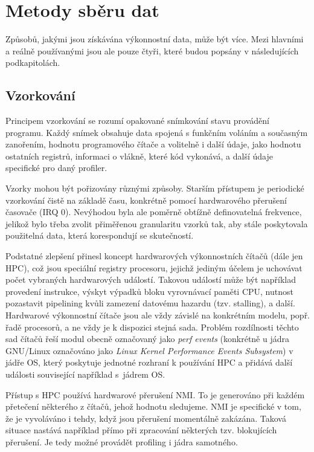 \documentclass[czech,BP]{thesiskiv}
\begin{document}
\section{Metody sběru dat}

Způsobů, jakými jsou získávána výkonnostní data, může být více. Mezi hlavními a reálně používanými jsou ale pouze čtyři, které budou popsány v následujících podkapitolách.

\subsection{Vzorkování}\label{subsec:sampling}

Principem vzorkování se rozumí opakované snímkování stavu provádění programu. Každý snímek obsahuje data spojená s funkčním voláním a současným zanořením, hodnotu programového čítače a volitelně i další údaje, jako hodnotu ostatních registrů, informaci o vlákně, které kód vykonává, a další údaje specifické pro daný profiler.

Vzorky mohou být pořizovány různými způsoby. Starším přístupem je periodické vzorkování čistě na základě času, konkrétně pomocí hardwarového přerušení časovače (IRQ 0). Nevýhodou byla ale poměrně obtížně definovatelná frekvence, jelikož bylo třeba zvolit přiměřenou granularitu vzorků tak, aby stále poskytovala použitelná data, která korespondují se skutečností.

Podstatné zlepšení přinesl koncept hardwarových výkonnostních čítačů (dále jen HPC), což jsou speciální registry procesoru, jejichž jediným účelem je uchovávat počet vybraných hardwarových událostí. Takovou událostí může být například provedení instrukce, výskyt výpadků bloku vyrovnávací paměti CPU, nutnost pozastavit pipelining kvůli zamezení datovému hazardu (tzv. stalling), a další. Hardwarové výkonnostní čítače jsou ale vždy závislé na konkrétním modelu, popř. řadě procesorů, a ne vždy je k dispozici stejná sada. Problém rozdílnosti těchto sad čítačů řeší modul obecně označovaný jako \emph{perf events} (konkrétně u jádra GNU/Linux označováno jako \emph{Linux Kernel Performance Events Subsystem}) v jádře OS, který poskytuje jednotné rozhraní k používání HPC a přidává další události související například s~jádrem OS\cite{perf1}.

Přístup s HPC používá hardwarové přerušení NMI. To je generováno při každém přetečení některého z čítačů, jehož hodnotu sledujeme\cite{perf1}. NMI je specifické v tom, že je vyvoláváno i tehdy, když jsou přerušení momentálně zakázána. Taková situace nastává například přímo při zpracování některých tzv. blokujících přerušení. Je tedy možné provádět profiling i jádra samotného.
\end{document}
